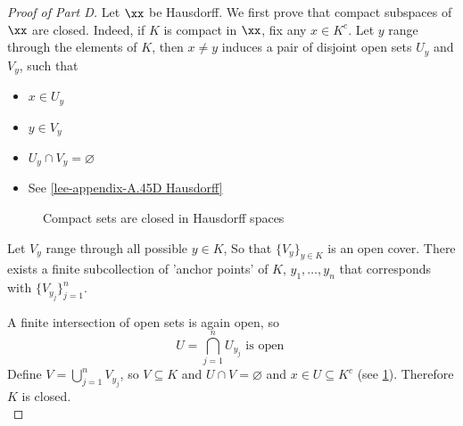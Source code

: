 \documentclass[../main-v2-manifolds.tex]{subfiles}
\begin{document}
\begin{proof}[Proof of  Part D]
    Let $\xx$ be Hausdorff. We first prove that compact subspaces of $\xx$ are closed. Indeed, if $K$ is compact in $\xx$, fix any $x\in K^c$. Let $y$ range through the elements of $K$, then $x\neq y$ induces a pair of disjoint open sets $U_y$ and $V_y$, such that
    
\begin{itemize}
    \item $x\in U_y$
    \item $y\in V_y$
    \item $U_y\cap V_y=\varnothing$
    \item See \cref{lee-appendix-A.45D Hausdorff}
\end{itemize}





\begin{figure}[htbp]
    \centering
    \caption{Compact sets are closed in Hausdorff spaces}
    \label{lee-appendix-A.45D-compact-open}
\end{figure}

Let $V_y$ range through all possible $y\in K$, So that $\{V_y\}_{y\in K}$ is an open cover. There exists a finite subcollection of 'anchor points' of $K$, $y_1,\ldots,y_n$ that corresponds with $\{V_{y_j}\}_{j=1}^n$.

A finite intersection of open sets is again open, so 
\[
    U = \bigcap_{j=1}^n U_{y_j}\text{ is open }
\]
Define $V = \bigcup_{j=1}^nV_{y_j}$, so $V\subseteq K$ and $U\cap V = \varnothing$ and $x\in U\subseteq K^c$ (see \cref{lee-appendix-A.45D-compact-open}). Therefore $K$ is closed.\\




\end{proof}
\end{document}
